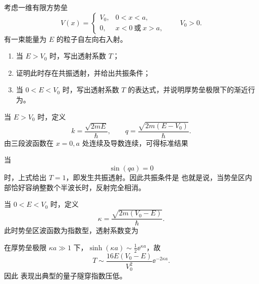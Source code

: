 \begin{question}
考虑一维有限方势垒
\[
V(x)=
\begin{cases}
V_0,& 0<x<a,\\
0,& x<0\ \text{或}\ x>a,
\end{cases}
\qquad V_0>0.
\]
有一束能量为 $E$ 的粒子自左向右入射。

\begin{enumerate}[label=(\arabic*),leftmargin=2.5em]
  \item 当 $E>V_0$ 时，写出透射系数 $T$；
  \item 证明此时存在共振透射，并给出共振条件；
  \item 当 $0<E<V_0$ 时，写出透射系数 $T$ 的表达式，并说明厚势垒极限下的渐近行为。
\end{enumerate}

\begin{solution}
当 $E>V_0$ 时，定义
\[
k=\frac{\sqrt{2mE}}{\hbar},
\qquad
q=\frac{\sqrt{2m(E-V_0)}}{\hbar}.
\]
由三段波函数在 $x=0,a$ 处连续及导数连续，可得标准结果

当
\[
\sin(qa)=0
\]
时，上式给出 $T=1$，即发生共振透射。因此共振条件是
也就是说，当势垒区内部恰好容纳整数个半波长时，反射完全相消。

当 $0<E<V_0$ 时，定义
\[
\kappa=\frac{\sqrt{2m(V_0-E)}}{\hbar}.
\]
此时势垒区波函数为指数型，透射系数变为

在厚势垒极限 $\kappa a\gg 1$ 下，$\sinh(\kappa a)\sim \tfrac12 \ee^{\kappa a}$，故
\[
T\sim \frac{16E(V_0-E)}{V_0^2}\ee^{-2\kappa a}.
\]
因此
表现出典型的量子隧穿指数压低。
\end{solution}
\end{question}

